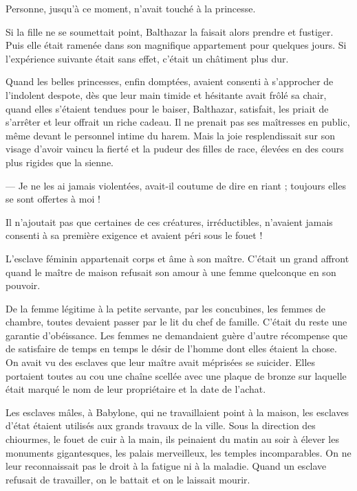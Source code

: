 \documentclass[a4paper, 11pt, oneside, polutonikogreek, french]{article}
\begin{document}
Personne, jusqu'à ce moment, n'avait touché à la princesse.

Si la fille ne se soumettait point, Balthazar la faisait alors prendre et fustiger. Puis elle était ramenée dans son magnifique appartement pour quelques jours. Si l'expérience suivante était sans effet, c'était un châtiment plus dur.

Quand les belles princesses, enfin domptées, avaient consenti à s'approcher de l'indolent despote, dès que leur main timide et hésitante avait frôlé sa chair, quand elles s'étaient tendues pour le baiser, Balthazar, satisfait, les priait de s'arrêter et leur offrait un riche cadeau. Il ne prenait pas ses maîtresses en public, même devant le personnel intime du harem. Mais la joie resplendissait sur son visage d'avoir vaincu la fierté et la pudeur des filles de race, élevées en des cours plus rigides que la sienne.

--- Je ne les ai jamais violentées, avait-il coutume de dire en riant ; toujours elles se sont offertes à moi !

Il n'ajoutait pas que certaines de ces créatures, irréductibles, n'avaient jamais consenti à sa première exigence et avaient péri sous le fouet !

\bigskip
\centerline{\EightStarTaper}
\centerline{\EightStarTaper\EightStarTaper}
\bigskip

L'esclave féminin appartenait corps et âme à son maître. C'était un grand affront quand le maître de maison refusait son amour à une femme quelconque en son pouvoir.

De la femme légitime à la petite servante, par les concubines, les femmes de chambre, toutes devaient passer par le lit du chef de famille. C'était du reste une garantie d'obéissance. Les femmes ne demandaient guère d'autre récompense que de satisfaire de temps en temps le désir de l'homme dont elles étaient la chose. On avait vu des esclaves que leur maître avait méprisées se suicider. Elles portaient toutes au cou une chaîne scellée avec une plaque de bronze sur laquelle était marqué le nom de leur propriétaire et la date de l'achat.

\bigskip
\centerline{\EightStarTaper}
\centerline{\EightStarTaper\EightStarTaper}
\bigskip

Les esclaves mâles, à Babylone, qui ne travaillaient point à la maison, les esclaves d'état étaient utilisés aux grands travaux de la ville. Sous la direction des chiourmes, le fouet de cuir à la main, ils peinaient du matin au soir à élever les monuments gigantesques, les palais merveilleux, les temples incomparables. On ne leur reconnaissait pas le droit à la fatigue ni à la maladie. Quand un esclave refusait de travailler, on le battait et on le laissait mourir.
\end{document}
